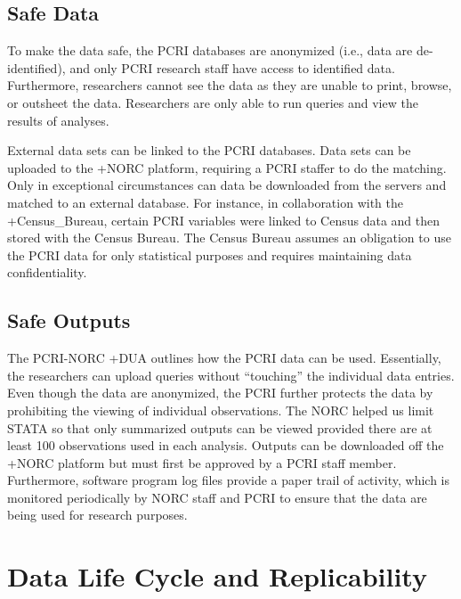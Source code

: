 \documentclass[
]{book}
\begin{document}
\hypertarget{safe-data-3}{%
\subsection{Safe Data}\label{safe-data-3}}

To make the data safe, the PCRI databases are anonymized (i.e., data are de-identified), and only PCRI research staff have access to identified data. Furthermore, researchers cannot see the data as they are unable to print, browse, or outsheet the data. Researchers are only able to run queries and view the results of analyses.

External data sets can be linked to the PCRI databases. Data sets can be uploaded to the +NORC\textbar{} platform, requiring a PCRI staffer to do the matching. Only in exceptional circumstances can data be downloaded from the servers and matched to an external database. For instance, in collaboration with the +Census\_Bureau\textbar, certain PCRI variables were linked to Census data and then stored with the Census Bureau. The Census Bureau assumes an obligation to use the PCRI data for only statistical purposes and requires maintaining data confidentiality.

\hypertarget{safe-outputs-3}{%
\subsection{Safe Outputs}\label{safe-outputs-3}}

The PCRI-NORC +DUA\textbar{} outlines how the PCRI data can be used. Essentially, the researchers can upload queries without ``touching'' the individual data entries. Even though the data are anonymized, the PCRI further protects the data by prohibiting the viewing of individual observations. The NORC helped us limit STATA so that only summarized outputs can be viewed provided there are at least 100 observations used in each analysis. Outputs can be downloaded off the +NORC\textbar{} platform but must first be approved by a PCRI staff member. Furthermore, software program log files provide a paper trail of activity, which is monitored periodically by NORC staff and PCRI to ensure that the data are being used for research purposes.

\hypertarget{data-life-cycle-and-replicability-2}{%
\section{Data Life Cycle and Replicability}\label{data-life-cycle-and-replicability-2}}
\end{document}
